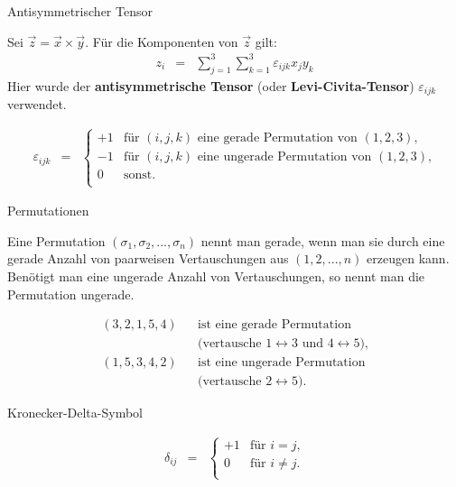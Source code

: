 \documentclass[german]{beamer}
\newcommand{\bq}{\begin{eqnarray*}}
\newcommand{\eq}{\end{eqnarray*}}
\newcommand{\eps}{\varepsilon}
\begin{document}
\begin{frame}{Antisymmetrischer Tensor}

Sei $\vec{z} = \vec{x} \times \vec{y}$.
F\"ur die Komponenten von $\vec{z}$ gilt:
\bq
 z_i & = & \sum\limits_{j=1}^3 \sum\limits_{k=1}^3 \eps_{ijk} x_j y_k
\eq
Hier wurde der {\bf antisymmetrische Tensor} (oder {\bf Levi-Civita-Tensor}) $\eps_{ijk}$ verwendet.
\begin{definition}
\bq
 \eps_{ijk} & = & \left\{
 \begin{array}{rl}
   +1 & \mbox{f\"ur $(i,j,k)$ eine gerade Permutation von $(1,2,3)$,} \\
   -1 & \mbox{f\"ur $(i,j,k)$ eine ungerade Permutation von $(1,2,3)$,} \\
   0 & \mbox{sonst}. \\
 \end{array}
\right.
\eq
\end{definition}

\end{frame}

\begin{frame}{Permutationen}

\begin{definition}
Eine Permutation $(\sigma_1,\sigma_2,...,\sigma_n)$ nennt man gerade, wenn man sie durch eine
gerade Anzahl von paarweisen Vertauschungen aus $(1,2,...,n)$ erzeugen kann.
Ben\"otigt man eine ungerade Anzahl von Vertauschungen, so nennt man die Permutation ungerade.
\end{definition}

\begin{example}
\bq
 (3,2,1,5,4) & & \mbox{ist eine gerade Permutation}
\nonumber \\
 & & \mbox{(vertausche $1\leftrightarrow 3$ und $4 \leftrightarrow 5$),}
\nonumber \\
 (1,5,3,4,2) & & \mbox{ist eine ungerade Permutation}
\nonumber \\
 & & \mbox{(vertausche $2\leftrightarrow 5$).}
\eq
\end{example}

\end{frame}

\begin{frame}{Kronecker-Delta-Symbol}

\begin{definition}
\bq
 \delta_{ij}
 & = & \left\{
 \begin{array}{rl}
   +1 & \mbox{f\"ur $i=j$,} \\
   0 & \mbox{f\"ur $i\neq j$}. \\
 \end{array}
\right.
\eq
\end{definition}

\end{frame}
\end{document}
